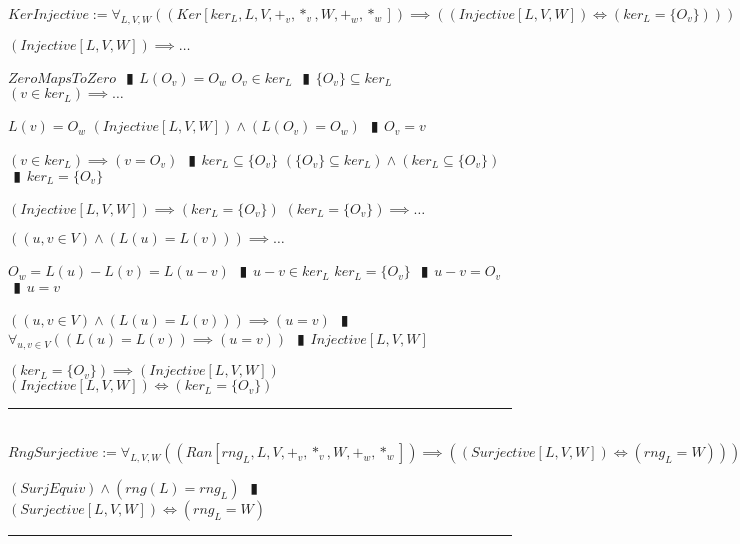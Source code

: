 \documentclass{book}
\newcommand{\abr}{:=}
\newcommand{\pipe}{$\phantom{(}\vrectangleblack\phantom{)}$}
\newcommand{\pr}[1]{\left(#1\right)}
\begin{document}
$KerInjective \abr \forall_{L, V, W}\pr{(Ker[ker_L, L, V, +_v, *_v, W, +_w, *_w]) \implies \pr{(Injective[L, V, W]) \iff (ker_L = \{O_v\})}}$
\begin{enumerate}
  \lit $(Injective[L, V, W]) \implies \ldots$
  \begin{enumerate}
    \lit $ZeroMapsToZero$ \pipe $L(O_v) = O_w$
    \lit $O_v \in ker_L$ \pipe $\{O_v\} \subseteq ker_L$
    \lit $(v \in ker_L) \implies \ldots$
    \begin{enumerate}
      \lit $L(v) = O_w$
      \lit $(Injective[L, V, W]) \land \pr{L(O_v) = O_w}$ \pipe $O_v = v$
    \end{enumerate}
    \lit $(v \in ker_L) \implies (v = O_v)$ \pipe $ker_L \subseteq \{O_v\}$
    \lit $(\{O_v\} \subseteq ker_L) \land (ker_L \subseteq \{O_v\})$ \pipe $ker_L = \{O_v\}$
  \end{enumerate}
  \lit $(Injective[L, V, W]) \implies (ker_L = \{O_v\})$
  \lit $(ker_L = \{O_v\}) \implies \ldots$
  \begin{enumerate}
    \lit $\pr{(u, v \in V) \land \pr{L(u) = L(v)}} \implies \ldots$
    \begin{enumerate}
      \lit $O_w = L(u) - L(v) = L(u - v)$ \pipe $u - v \in ker_L$
      \lit $ker_L = \{O_v\}$ \pipe $u - v = O_v$ \pipe $u = v$
    \end{enumerate}
    \lit $\pr{(u, v \in V) \land \pr{L(u) = L(v)}} \implies (u = v)$ \pipe $\forall_{u, v \in V}\pr{\pr{L(u) = L(v)} \implies (u = v)}$ \pipe $Injective[L, V, W]$
  \end{enumerate}
  \lit $(ker_L = \{O_v\}) \implies (Injective[L, V, W])$
  \lit $(Injective[L, V, W]) \iff (ker_L = \{O_v\})$
\end{enumerate} \vspace{.75mm} \hrule \vspace{.75mm} \ \\ 

$RngSurjective \abr \forall_{L, V, W}\pr{(Ran[rng_L, L, V, +_v, *_v, W, +_w, *_w]) \implies \pr{(Surjective[L, V, W]) \iff (rng_L = W)}}$
\begin{enumerate}
  \lit $(SurjEquiv) \land \pr{rng(L) = rng_L}$ \pipe $(Surjective[L, V, W]) \iff (rng_L = W)$
\end{enumerate} \vspace{.75mm} \hrule \vspace{.75mm} \ \\ 
\end{document}
